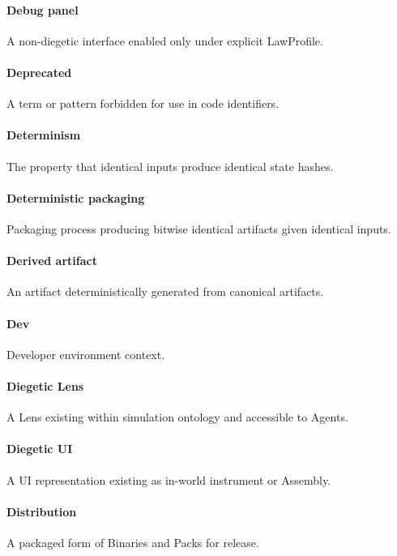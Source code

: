 \documentclass[9pt,a4paper,openany]{book}
\begin{document}
\paragraph{Debug panel}
A non-\allowbreak{}diegetic interface enabled only under explicit LawProfile.\allowbreak{}


\paragraph{Deprecated}
A term or pattern forbidden for use in code identifiers.\allowbreak{}


\paragraph{Determinism}
The property that identical inputs produce identical state hashes.\allowbreak{}


\paragraph{Deterministic packaging}
Packaging process producing bitwise identical artifacts given identical inputs.\allowbreak{}


\paragraph{Derived artifact}
An artifact deterministically generated from canonical artifacts.\allowbreak{}


\paragraph{Dev}
Developer environment context.\allowbreak{}


\paragraph{Diegetic Lens}
A Lens existing within simulation ontology and accessible to Agents.\allowbreak{}


\paragraph{Diegetic UI}
A UI representation existing as in-\allowbreak{}world instrument or Assembly.\allowbreak{}


\paragraph{Distribution}
A packaged form of Binaries and Packs for release.\allowbreak{}
\end{document}

